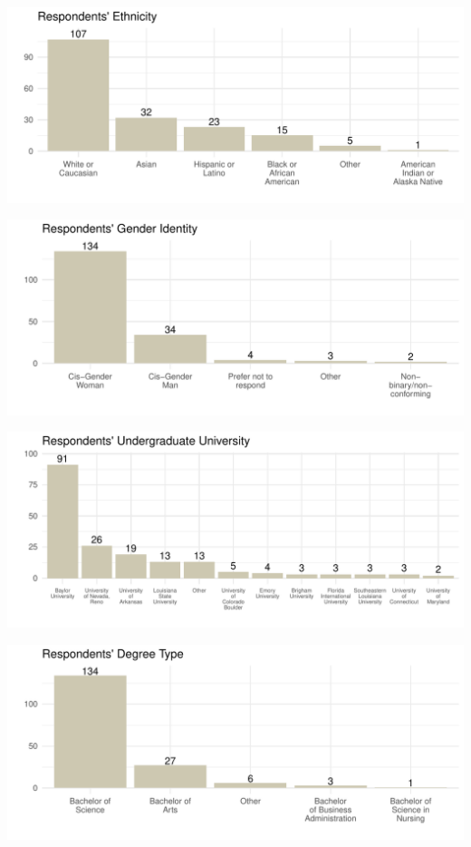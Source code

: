 \documentclass[
  letterpaper,
  DIV=11,
  numbers=noendperiod]{scrartcl}
\begin{document}
\includegraphics{GlobalHealthQuarto1-5_files/figure-pdf/unnamed-chunk-4-1.pdf}

\includegraphics{GlobalHealthQuarto1-5_files/figure-pdf/unnamed-chunk-5-1.pdf}

\includegraphics{GlobalHealthQuarto1-5_files/figure-pdf/unnamed-chunk-6-1.pdf}

\includegraphics{GlobalHealthQuarto1-5_files/figure-pdf/unnamed-chunk-7-1.pdf}
\end{document}
